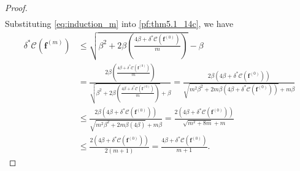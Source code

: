 \documentclass[onefignum,onetabnum]{siamonline220329}
\numberwithin{equation}{section}
\def\f{\mathbf{f}}
\begin{document}
\begin{sloppypar}
\begin{proof}
\begin{align}
\end{align}
Substituting \eqref{eq:induction_m} into \eqref{pf:thm5.1_14c}, we have
\begin{align*}
\delta^*\mathcal{C}(\f^{(m)})
&\leq \sqrt{\beta^2 + 2\beta \left(\frac{4\beta + \delta^*\mathcal{C}(\f^{(0)})}{m}\right)} - \beta \\
&= \frac{2\beta \left(\frac{4\beta + \delta^*\mathcal{C}(\f^{(0)})}{m}\right)}{\sqrt{\beta^2 + 2\beta \left(\frac{4\beta + \delta^*\mathcal{C}(\f^{(0)})}{m}\right)} + \beta} 
= \frac{2\beta \left(4\beta + \delta^*\mathcal{C}(\f^{(0)})\right)}{\sqrt{m^2\beta^2 + 2m\beta \left(4\beta + \delta^*\mathcal{C}(\f^{(0)})\right)} + m\beta} \\
&\leq \frac{2\beta \left(4\beta + \delta^*\mathcal{C}(\f^{(0)})\right)}{\sqrt{m^2\beta^2 + 2m\beta \left(4\beta \right)} + m\beta} 
= \frac{2 \left(4\beta + \delta^*\mathcal{C}(\f^{(0)})\right)}{\sqrt{m^2 + 8m} + m} \\
&\leq \frac{2 \left(4\beta + \delta^*\mathcal{C}(\f^{(0)})\right)}{2(m+1)} 
= \frac{4\beta + \delta^*\mathcal{C}(\f^{(0)})}{m+1}.
\end{align*}
\end{proof}


\end{sloppypar}
\end{document}
